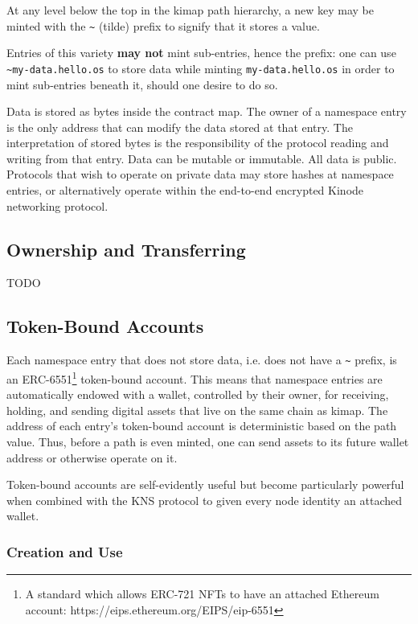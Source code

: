 \documentclass[runningheads]{llncs}
\begin{document}
At any level below the top in the kimap path hierarchy, a new key may be minted with the \verb|~| (tilde) prefix to signify that it stores a value.

Entries of this variety \textbf{may not} mint sub-entries, hence the prefix: one can use \verb|~my-data.hello.os| to store data while minting \verb|my-data.hello.os| in order to mint sub-entries beneath it, should one desire to do so.

Data is stored as bytes inside the contract map.
The owner of a namespace entry is the only address that can modify the data stored at that entry.
The interpretation of stored bytes is the responsibility of the protocol reading and writing from that entry.
Data can be mutable or immutable.
All data is public.
Protocols that wish to operate on private data may store hashes at namespace entries, or alternatively operate within the end-to-end encrypted Kinode networking protocol.

\subsection{Ownership and Transferring}

TODO

\subsection{Token-Bound Accounts}

Each namespace entry that does not store data, i.e. does not have a \verb|~| prefix, is an ERC-6551\footnote{A standard which allows ERC-721 NFTs to have an attached Ethereum account:  https://eips.ethereum.org/EIPS/eip-6551} token-bound account.
This means that namespace entries are automatically endowed with a wallet, controlled by their owner, for receiving, holding, and sending digital assets that live on the same chain as kimap.
The address of each entry's token-bound account is deterministic based on the path value.
Thus, before a path is even minted, one can send assets to its future wallet address or otherwise operate on it.

Token-bound accounts are self-evidently useful but become particularly powerful when combined with the KNS protocol to given every node identity an attached wallet.

\subsubsection{Creation and Use}
\end{document}
